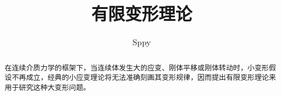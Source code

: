 \documentclass[lang=cn,11pt,a4paper,cite=numbers]{elegantpaper}
\title{有限变形理论}
\author{Sppy}
\institute{\href{http://sppy.site/}{sppy.site}}
\date{\zhtoday}
\begin{document}
\setlength\abovedisplayshortskip{2pt}
\setlength\belowdisplayshortskip{2pt}
\setlength\abovedisplayskip{3pt}
\setlength\belowdisplayskip{3pt}

\maketitle

\begin{abstract}
在连续介质力学的框架下，当连续体发生大的应变、刚体平移或刚体转动时，小变形假设不再成立，经典的小应变理论将无法准确刻画其变形规律，因而提出有限变形理论来用于研究这种大变形问题。
\end{abstract}




\end{document}
